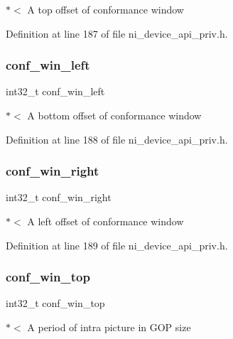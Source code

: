 $\ast$$<$ A top offset of conformance window 

Definition at line 187 of file ni\+\_\+device\+\_\+api\+\_\+priv.\+h.

\mbox{\label{struct__ni__t408__config__t_a861b75deb87d0311ab713c372a89c3db}} 
\subsubsection{\texorpdfstring{conf\_win\_left}{conf\_win\_left}}
{\footnotesize\ttfamily int32\+\_\+t conf\+\_\+win\+\_\+left}

$\ast$$<$ A bottom offset of conformance window 

Definition at line 188 of file ni\+\_\+device\+\_\+api\+\_\+priv.\+h.

\mbox{\label{struct__ni__t408__config__t_a997a7dfa78ea00ad507e5602b591d18e}} 
\subsubsection{\texorpdfstring{conf\_win\_right}{conf\_win\_right}}
{\footnotesize\ttfamily int32\+\_\+t conf\+\_\+win\+\_\+right}

$\ast$$<$ A left offset of conformance window 

Definition at line 189 of file ni\+\_\+device\+\_\+api\+\_\+priv.\+h.

\mbox{\label{struct__ni__t408__config__t_ab6956f53cb5a13e13bae34ebc7191735}} 
\subsubsection{\texorpdfstring{conf\_win\_top}{conf\_win\_top}}
{\footnotesize\ttfamily int32\+\_\+t conf\+\_\+win\+\_\+top}

$\ast$$<$ A period of intra picture in G\+OP size 

